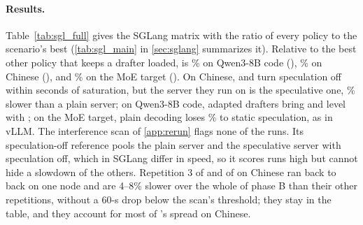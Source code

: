 \begin{table}[t]
\caption{SGLang: phase-B throughput change relative to  (paired mean $\pm$ standard deviation over three repetitions; ratio to the best policy of the scenario in parentheses; best policy in bold). Last column: the worst ratio across scenarios.}
\label{tab:sgl_full}
\centering\small
{}
\end{table}

\paragraph{Results.} Table~\ref{tab:sgl_full} gives the SGLang matrix with the ratio of every policy to the scenario's best (\cref{tab:sgl_main} in \cref{sec:sglang} summarizes it). Relative to the best other policy that keeps a drafter loaded,  is \% on Qwen3-8B code (), \% on Chinese (), and \% on the MoE target (). On Chinese,  and  turn speculation off within seconds of saturation, but the server they run on is the speculative one, \% slower than a plain server; on Qwen3-8B code, adapted drafters bring  and  level with ; on the MoE target, plain decoding loses \% to static speculation, as in vLLM. The interference scan of \cref{app:rerun} flags none of the  runs. Its speculation-off reference pools the plain server and the speculative server with speculation off, which in SGLang differ in speed, so it scores  runs high but cannot hide a slowdown of the others. Repetition 3 of  and of  on Chinese ran back to back on one node and are 4--8\% slower over the whole of phase B than their other repetitions, without a 60-s drop below the scan's threshold; they stay in the table, and they account for most of 's spread on Chinese.

\begin{table}[t]
\caption{SGLang checkpoint: hashes of the port and its calibration (the files reused from the vLLM checkpoint have the hashes of Table~\ref{tab:manifest}).}
\label{tab:sgl_manifest}
\centering\small
{}
\end{table}
